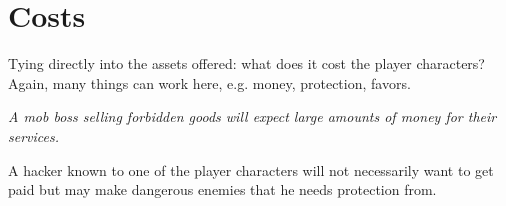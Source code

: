 \documentclass[12pt,a4paper,openany,usenames,dvipsnames]{book}
\begin{document}
	\section*{Costs}
	Tying directly into the assets offered: what does it cost the player characters? Again, many things can work here, e.g. money, protection, favors.
	\begin{exampleblock}
		\itshape A mob boss selling forbidden goods will expect large amounts of money for their services.\par
		A hacker known to one of the player characters will not necessarily want to get paid but may make dangerous enemies that he needs protection from.
	\end{exampleblock}

\end{document}
